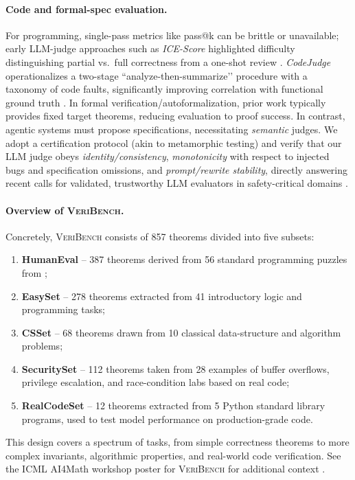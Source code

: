 \documentclass{article}
\begin{document}
\paragraph{Code and formal-spec evaluation.}
For programming, single-pass metrics like pass@k can be brittle or unavailable; early LLM-judge approaches such as \emph{ICE-Score} highlighted difficulty distinguishing partial vs.\ full correctness from a one-shot review \citep{Zhuo2024ICEScore}. \emph{CodeJudge} operationalizes a two-stage “analyze-then-summarize’’ procedure with a taxonomy of code faults, significantly improving correlation with functional ground truth \citep{TongZhang2024CodeJudge}. In formal verification/autoformalization, prior work typically provides fixed target theorems, reducing evaluation to proof success. In contrast, agentic systems must propose specifications, necessitating \emph{semantic} judges. We adopt a certification protocol (akin to metamorphic testing) and verify that our LLM judge obeys \emph{identity/consistency}, \emph{monotonicity} with respect to injected bugs and specification omissions, and \emph{prompt/rewrite stability}, directly answering recent calls for validated, trustworthy LLM evaluators in safety-critical domains \citep{Kocmi2024HumanVsLLM,Li2024TrustLLMJudgments}.

\paragraph{Overview of \textsc{VeriBench}.}
Concretely, \textsc{VeriBench} consists of 857 theorems divided into five subsets:
\begin{enumerate}
  \item \textbf{HumanEval} – 387 theorems derived from 56 standard programming puzzles from \citet{chen2021evaluating};
  \item \textbf{EasySet} – 278 theorems extracted from 41 introductory logic and programming tasks;
  \item \textbf{CSSet} – 68 theorems drawn from 10 classical data-structure and algorithm problems;
  \item \textbf{SecuritySet} – 112 theorems taken from 28 examples of buffer overflows, privilege escalation, and race-condition labs based on real code;
  \item \textbf{RealCodeSet} – 12 theorems extracted from 5 Python standard library programs, used to test model performance on production-grade code.
\end{enumerate}
This design covers a spectrum of tasks, from simple correctness theorems to more complex invariants, algorithmic properties, and real-world code verification. See the ICML AI4Math workshop poster for \textsc{VeriBench} for additional context \citep{veribench_icml25}.
\end{document}
